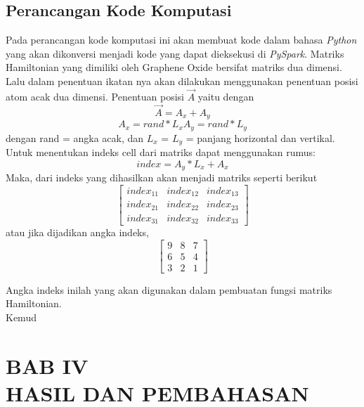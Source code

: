 \documentclass[12pt,a4paper]{report}
\begin{document}
	\section{Perancangan Kode Komputasi}
	Pada perancangan kode komputasi ini akan membuat kode dalam bahasa \textit{Python} yang akan dikonversi menjadi kode yang dapat dieksekusi di \textit{PySpark}. Matriks Hamiltonian yang dimiliki oleh Graphene Oxide bersifat matriks dua dimensi. Lalu dalam penentuan ikatan nya akan dilakukan menggunakan penentuan posisi atom acak dua dimensi. Penentuan posisi {$\vec{A}$} yaitu dengan
	\begin{equation}
	\vec{A} = A_x + A_y
	\end{equation}
	\begin{equation}
	A_x = rand * L_x
	A_y = rand * L_y
	\end{equation}
	dengan rand = angka acak, dan
	{$L_x$} = {$L_y$} = panjang horizontal dan vertikal.\\
	Untuk menentukan indeks cell dari matriks dapat menggunakan rumus:
	\begin{equation}
	index = A_y * L_x + A_x
	\end{equation}
	Maka, dari indeks yang dihasilkan akan menjadi matriks seperti berikut
	\begin{equation}
	\begin{bmatrix}
	index_{11} & index_{12} & index_{13} \\
	index_{21} & index_{22} & index_{23} \\
	index_{31} & index_{32} & index_{33}
	\end{bmatrix}
	\end{equation}
	atau jika dijadikan angka indeks,
	\begin{equation}
	\begin{bmatrix}
	9 & 8 & 7 \\
	6 & 5 & 4 \\
	3 & 2 & 1
	\end{bmatrix}
	\end{equation}
	
	Angka indeks inilah yang akan digunakan dalam pembuatan fungsi matriks Hamiltonian.\\
	
	Kemud
	
	
\chapter*{BAB IV \\ HASIL DAN PEMBAHASAN}
\setcounter{chapter}{4}
\setcounter{section}{0}
\setcounter{figure}{0}
\setcounter{equation}{0}
\thispagestyle{myplain}
\end{document}
